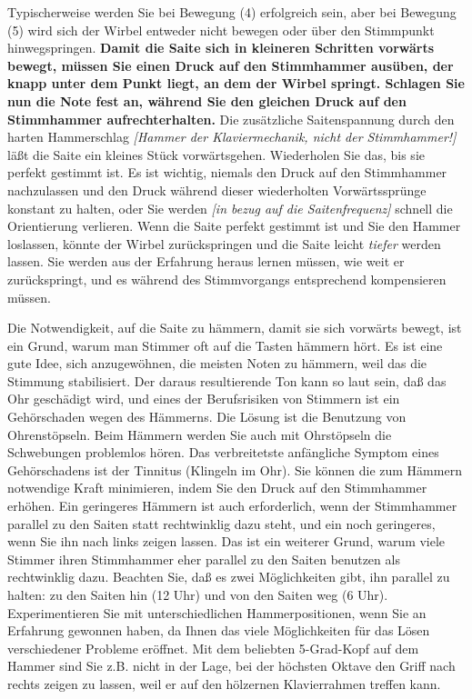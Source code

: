 Typischerweise werden Sie bei Bewegung (4) erfolgreich sein, aber bei Bewegung (5) wird sich der Wirbel entweder nicht bewegen oder über den Stimmpunkt hinwegspringen.
 \textbf{Damit die Saite sich in kleineren Schritten vorwärts bewegt, müssen Sie einen Druck auf den Stimmhammer ausüben, der knapp unter dem Punkt liegt, an dem der Wirbel springt.
 Schlagen Sie nun die Note fest an, während Sie den gleichen Druck auf den Stimmhammer aufrechterhalten.}
 Die zusätzliche Saitenspannung durch den harten Hammerschlag \textit{[Hammer der Klaviermechanik, nicht der Stimmhammer!]} läßt die Saite ein kleines Stück vorwärtsgehen.
 Wiederholen Sie das, bis sie perfekt gestimmt ist.
 Es ist wichtig, niemals den Druck auf den Stimmhammer nachzulassen und den Druck während dieser wiederholten Vorwärtssprünge konstant zu halten, oder Sie werden \textit{[in bezug auf die Saitenfrequenz]} schnell die Orientierung verlieren.
 Wenn die Saite perfekt gestimmt ist und Sie den Hammer loslassen, könnte der Wirbel zurückspringen und die Saite leicht \textit{tiefer} werden lassen. Sie werden aus der Erfahrung heraus lernen müssen, wie weit er zurückspringt, und es während des Stimmvorgangs entsprechend kompensieren müssen.
 

Die Notwendigkeit, auf die Saite zu hämmern, damit sie sich vorwärts bewegt, ist ein Grund, warum man Stimmer oft auf die Tasten hämmern hört.
 Es ist eine gute Idee, sich anzugewöhnen, die meisten Noten zu hämmern, weil das die Stimmung stabilisiert.
 Der daraus resultierende Ton kann so laut sein, daß das Ohr geschädigt wird, und eines der Berufsrisiken von Stimmern ist ein Gehörschaden wegen des Hämmerns.
 Die Lösung ist die Benutzung von Ohrenstöpseln.
 Beim Hämmern werden Sie auch mit Ohrstöpseln die Schwebungen problemlos hören.
 Das verbreitetste anfängliche Symptom eines Gehörschadens ist der Tinnitus (Klingeln im Ohr).
 Sie können die zum Hämmern notwendige Kraft minimieren, indem Sie den Druck auf den Stimmhammer erhöhen.
 Ein geringeres Hämmern ist auch erforderlich, wenn der Stimmhammer parallel zu den Saiten statt rechtwinklig dazu steht, und ein noch geringeres, wenn Sie ihn nach links zeigen lassen.
 Das ist ein weiterer Grund, warum viele Stimmer ihren Stimmhammer eher parallel zu den Saiten benutzen als rechtwinklig dazu.
 Beachten Sie, daß es zwei Möglichkeiten gibt, ihn parallel zu halten: zu den Saiten hin (12 Uhr) und von den Saiten weg (6 Uhr).
 Experimentieren Sie mit unterschiedlichen Hammerpositionen, wenn Sie an Erfahrung gewonnen haben, da Ihnen das viele Möglichkeiten für das Lösen verschiedener Probleme eröffnet.
 Mit dem beliebten 5-Grad-Kopf auf dem Hammer sind Sie z.B. nicht in der Lage, bei der höchsten Oktave den Griff nach rechts zeigen zu lassen, weil er auf den hölzernen Klavierrahmen treffen kann.
 \hypertarget{c2_5g}{}\hypertarget{c2_5_span}{}

